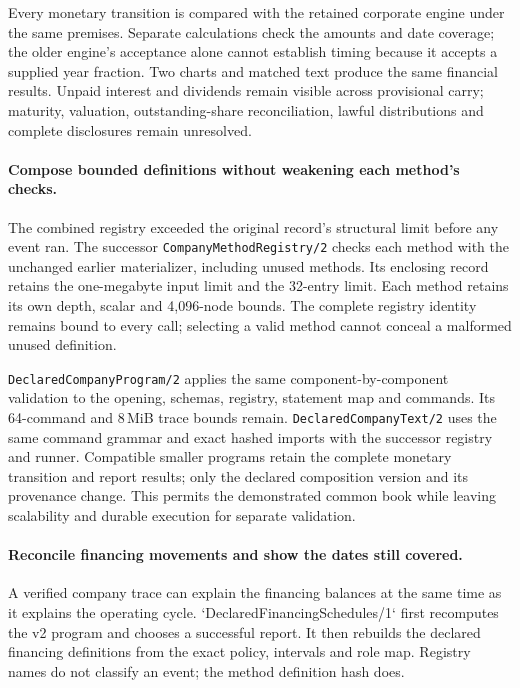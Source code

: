 Every monetary transition is compared with the retained corporate engine under
the same premises. Separate calculations check the amounts and date coverage;
the older engine's acceptance alone cannot establish timing because it accepts a
supplied year fraction. Two charts and matched text produce the same financial
results. Unpaid interest and dividends remain visible across provisional carry;
maturity, valuation, outstanding-share reconciliation, lawful distributions and
complete disclosures remain unresolved.

\paragraph{Compose bounded definitions without weakening each method's checks.}
The combined registry exceeded the original record's structural limit before any
event ran. The successor \texttt{CompanyMethodRegistry/2} checks each method with
the unchanged earlier materializer, including unused methods. Its enclosing
record retains the one-megabyte input limit and the 32-entry limit. Each method
retains its own depth, scalar and 4,096-node bounds. The complete registry identity
remains bound to every call; selecting a valid method cannot conceal a malformed
unused definition.

\texttt{DeclaredCompanyProgram/2} applies the same component-by-component validation
to the opening, schemas, registry, statement map and commands. Its 64-command and
8\,MiB trace bounds remain. \texttt{DeclaredCompanyText/2} uses the same command
grammar and exact hashed imports with the successor registry and runner.
Compatible smaller programs retain the complete monetary transition and report
results; only the declared composition version and its provenance change.
This permits the demonstrated common book while leaving scalability and durable
execution for separate validation.


\paragraph{Reconcile financing movements and show the dates still covered.}
A verified company trace can explain the financing balances at the same time as it explains the operating cycle. `DeclaredFinancingSchedules/1` first recomputes the v2 program and chooses a successful report. It then rebuilds the declared financing definitions from the exact policy, intervals and role map. Registry names do not classify an event; the method definition hash does.

